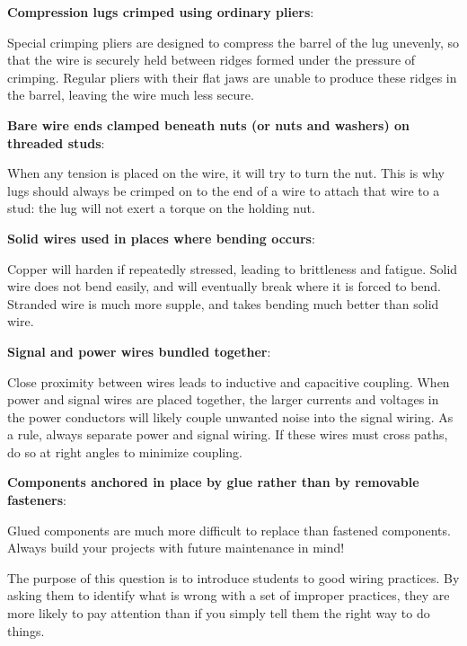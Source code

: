 \vskip 10pt

\noindent
{\bf Compression lugs crimped using ordinary pliers}:

Special crimping pliers are designed to compress the barrel of the lug unevenly, so that the wire is securely held between ridges formed under the pressure of crimping.  Regular pliers with their flat jaws are unable to produce these ridges in the barrel, leaving the wire much less secure.

\vskip 10pt

\noindent
{\bf Bare wire ends clamped beneath nuts (or nuts and washers) on threaded studs}:

When any tension is placed on the wire, it will try to turn the nut.  This is why lugs should always be crimped on to the end of a wire to attach that wire to a stud: the lug will not exert a torque on the holding nut.

\vskip 10pt

\noindent
{\bf Solid wires used in places where bending occurs}:

Copper will harden if repeatedly stressed, leading to brittleness and fatigue.  Solid wire does not bend easily, and will eventually break where it is forced to bend.  Stranded wire is much more supple, and takes bending much better than solid wire.

\vskip 10pt

\noindent
{\bf Signal and power wires bundled together}:

Close proximity between wires leads to inductive and capacitive coupling.  When power and signal wires are placed together, the larger currents and voltages in the power conductors will likely couple unwanted noise into the signal wiring.  As a rule, always separate power and signal wiring.  If these wires must cross paths, do so at right angles to minimize coupling.

\vskip 10pt

\noindent
{\bf Components anchored in place by glue rather than by removable fasteners}:

Glued components are much more difficult to replace than fastened components.  Always build your projects with future maintenance in mind!







The purpose of this question is to introduce students to good wiring practices.  By asking them to identify what is wrong with a set of improper practices, they are more likely to pay attention than if you simply tell them the right way to do things.




